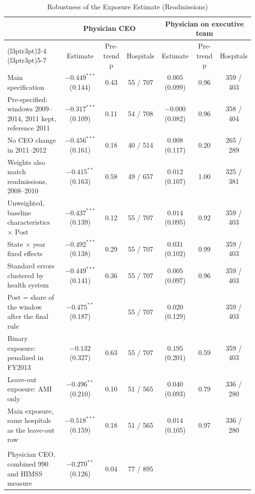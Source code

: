\begin{table}

\caption{\label{tab:app_robustness}Robustness of the Exposure Estimate (Readmissions)}
\centering
\begin{threeparttable}
\begin{tabular}[t]{lcccccc}
\toprule
\multicolumn{1}{c}{ } & \multicolumn{3}{c}{Physician CEO} & \multicolumn{3}{c}{Physician on executive team} \\
\cmidrule(l{3pt}r{3pt}){2-4} \cmidrule(l{3pt}r{3pt}){5-7}
 & Estimate & Pre-trend p & Hospitals & Estimate & Pre-trend p & Hospitals\\
\midrule
Main specification & $-0.449^{***}$ (0.144) & 0.43 & 55 / 707 & $0.005$ (0.099) & 0.96 & 359 / 403\\
Pre-specified: windows 2009--2014, 2011 kept, reference 2011 & $-0.317^{***}$ (0.109) & 0.11 & 54 / 708 & $-0.000$ (0.082) & 0.96 & 358 / 404\\
No CEO change in 2011--2012 & $-0.456^{***}$ (0.161) & 0.18 & 40 / 514 & $0.008$ (0.117) & 0.20 & 265 / 289\\
Weights also match readmissions, 2008--2010 & $-0.415^{**}$ (0.163) & 0.58 & 49 / 657 & $0.012$ (0.107) & 1.00 & 325 / 381\\
Unweighted, baseline characteristics $\times$ Post & $-0.437^{***}$ (0.139) & 0.12 & 55 / 707 & $0.014$ (0.095) & 0.92 & 359 / 403\\
State $\times$ year fixed effects & $-0.492^{***}$ (0.138) & 0.29 & 55 / 707 & $0.031$ (0.102) & 0.99 & 359 / 403\\
Standard errors clustered by health system & $-0.449^{***}$ (0.141) & 0.36 & 55 / 707 & $0.005$ (0.097) & 0.96 & 359 / 403\\
Post = share of the window after the final rule & $-0.475^{**}$ (0.187) &  & 55 / 707 & $0.020$ (0.129) &  & 359 / 403\\
Binary exposure: penalized in FY2013 & $-0.132$ (0.327) & 0.63 & 55 / 707 & $0.195$ (0.201) & 0.59 & 359 / 403\\
Leave-out exposure: AMI only & $-0.496^{**}$ (0.210) & 0.10 & 51 / 565 & $0.040$ (0.093) & 0.79 & 336 / 280\\
Main exposure, same hospitals as the leave-out row & $-0.518^{***}$ (0.159) & 0.18 & 51 / 565 & $0.014$ (0.105) & 0.97 & 336 / 280\\
\addlinespace[0.3em]
\multicolumn{7}{l}{\textbf{Alternative CEO measures}}\\
\hspace{1em}Physician CEO, combined 990 and HIMSS measure & $-0.270^{**}$ (0.126) & 0.04 & 77 / 895 &  &  & \\

\end{tabular}
\end{threeparttable}
\end{table}
